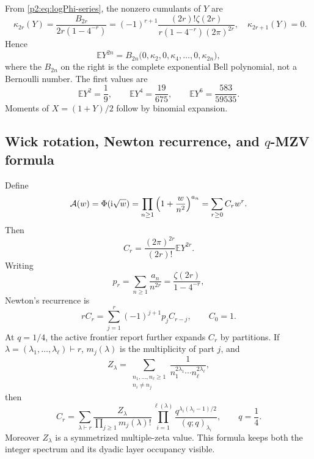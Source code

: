 \documentclass[11pt]{article}
\theoremstyle{definition}
\theoremstyle{remark}
\newcommand{\E}{\mathbb E}
\begin{document}
From \eqref{p2:eq:logPhi-series}, the nonzero cumulants of $Y$ are
\begin{equation}
 \boxed{\quad
 \kappa_{2r}(Y)
 =\frac{B_{2r}}{2r(1-4^{-r})}
 =(-1)^{r+1}\frac{(2r)!\zeta(2r)}
 {r(1-4^{-r})(2\pi)^{2r}},
 \quad \kappa_{2r+1}(Y)=0.
 \quad}                                                  \label{p2:eq:Y-cumulants}
\end{equation}
Hence
\begin{equation}
 \E Y^{2n}=B_{2n}\bigl(0,\kappa_2,0,\kappa_4,\dots,0,\kappa_{2n}\bigr), \label{p2:eq:Bell-moments}
\end{equation}
where the $B_{2n}$ on the right is the complete exponential Bell polynomial, not a Bernoulli
number.  The first values are
\begin{equation}
 \E Y^2=\frac19,\qquad
 \E Y^4=\frac{19}{675},\qquad
 \E Y^6=\frac{583}{59535}.                               \label{p2:eq:first-moments}
\end{equation}
Moments of $X=(1+Y)/2$ follow by binomial expansion.

\subsection{Wick rotation, Newton recurrence, and \texorpdfstring{$q$}{q}-MZV formula}

Define
\begin{equation}
 \mathcal A(w)=\Phi(\mathrm i\sqrt w)
 =\prod_{n\ge1}\left(1+\frac{w}{n^2}\right)^{a_n}
 =\sum_{r\ge0}C_rw^r.                                    \label{p2:eq:A-def}
\end{equation}
Then
\begin{equation}
 C_r=\frac{(2\pi)^{2r}}{(2r)!}\E Y^{2r}.                 \label{p2:eq:C-moment}
\end{equation}
Writing
\begin{equation}
 p_r=\sum_{n\ge1}\frac{a_n}{n^{2r}}
 =\frac{\zeta(2r)}{1-4^{-r}},                            \label{p2:eq:pr}
\end{equation}
Newton's recurrence is
\begin{equation}
 rC_r=\sum_{j=1}^r(-1)^{j+1}p_jC_{r-j},\qquad C_0=1.    \label{p2:eq:Newton-C}
\end{equation}
At $q=1/4$, the active frontier report further expands $C_r$ by partitions.  If
$\lambda=(\lambda_1,\dots,\lambda_\ell)\vdash r$, $m_j(\lambda)$ is the multiplicity of
part $j$, and
\begin{equation}
 Z_\lambda=\sum_{\substack{n_1,\dots,n_\ell\ge1\\n_i\ne n_j}}
 \frac{1}{n_1^{2\lambda_1}\cdots n_\ell^{2\lambda_\ell}},                \label{p2:eq:Zlambda}
\end{equation}
then
\begin{equation}
 \boxed{\quad
 C_r=\sum_{\lambda\vdash r}
 \frac{Z_\lambda}{\prod_{j\ge1}m_j(\lambda)!}
 \prod_{i=1}^{\ell(\lambda)}
 \frac{q^{\lambda_i(\lambda_i-1)/2}}{(q;q)_{\lambda_i}},
 \qquad q=\frac14.
 \quad}                                                  \label{p2:eq:q-MZV}
\end{equation}
Moreover $Z_\lambda$ is a symmetrized multiple-zeta value.  This formula keeps both the
integer spectrum and its dyadic layer occupancy visible.
\end{document}
